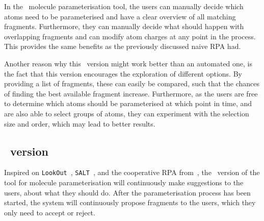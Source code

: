 In the \IDa\ molecule parameterisation tool, the users can manually decide which atoms need to be parameterised and have a clear overview of all matching fragments. Furthermore, they can manually decide what should happen with overlapping fragments and can modify atom charges at any point in the process. This provides the same benefits as the previously discussed naive RPA had.

Another reason why this \IDa\ version might work better than an automated one, is the fact that this version encourages the exploration of different options. By providing a list of fragments, these can easily be compared, such that the chances of finding the best available fragment increase. Furthermore, as the users are free to determine which atoms should be parameterised at which point in time, and are also able to select groups of atoms, they can experiment with the selection size and order, which may lead to better results.


\subsection{\IDB\ version}
Inspired on \verb|LookOut|~\cite{horvitz1999principles}, \verb|SALT|~\cite{marcus1987taking}, and the cooperative RPA from~\cite{payne2000varying}, the \IDb\ version of the tool for molecule parameterisation will continuously make suggestions to the users, about what they should do. After the parameterisation process has been started, the system will continuously propose fragments to the users, which they only need to accept or reject.

